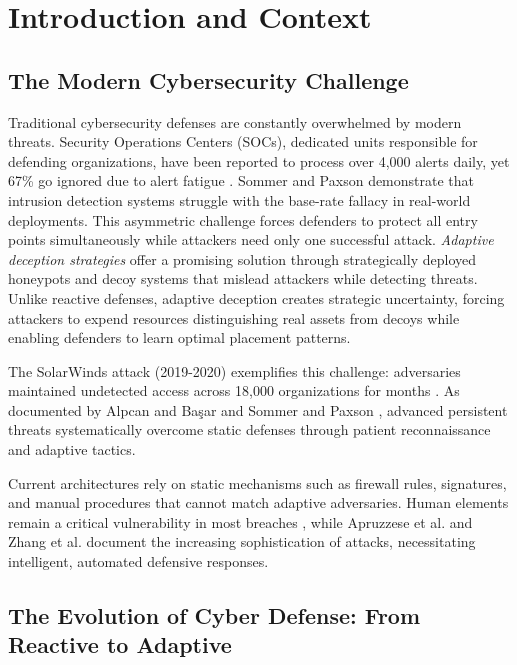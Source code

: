 \documentclass[12pt,oneside]{article}
\begin{document}
\section{Introduction and Context}

\subsection{The Modern Cybersecurity Challenge}

Traditional cybersecurity defenses are constantly overwhelmed by modern threats. Security Operations Centers (SOCs), dedicated units responsible for defending organizations, have been reported to process over 4,000 alerts daily, yet 67\% go ignored due to alert fatigue \cite{vectra2023threat}. Sommer and Paxson \cite{sommer2010outside} demonstrate that intrusion detection systems struggle with the base-rate fallacy in real-world deployments. This asymmetric challenge forces defenders to protect all entry points simultaneously while attackers need only one successful attack. \textit{Adaptive deception strategies} offer a promising solution through strategically deployed honeypots and decoy systems that mislead attackers while detecting threats. Unlike reactive defenses, adaptive deception creates strategic uncertainty, forcing attackers to expend resources distinguishing real assets from decoys while enabling defenders to learn optimal placement patterns.

The SolarWinds attack (2019-2020) exemplifies this challenge: adversaries maintained undetected access across 18,000 organizations for months \cite{gao2021solarwinds,bitlyft2023solarwinds}. As documented by Alpcan and Başar \cite{alpcan2010network} and Sommer and Paxson \cite{sommer2010outside}, advanced persistent threats systematically overcome static defenses through patient reconnaissance and adaptive tactics. 

Current architectures rely on static mechanisms such as firewall rules, signatures, and manual procedures that cannot match adaptive adversaries. Human elements remain a critical vulnerability in most breaches \cite{hadlington2017human}, while Apruzzese et al. \cite{apruzzese2022deep} and Zhang et al. \cite{zhang2020adversarial} document the increasing sophistication of attacks, necessitating intelligent, automated defensive responses.


\subsection{The Evolution of Cyber Defense: From Reactive to Adaptive}
\end{document}
